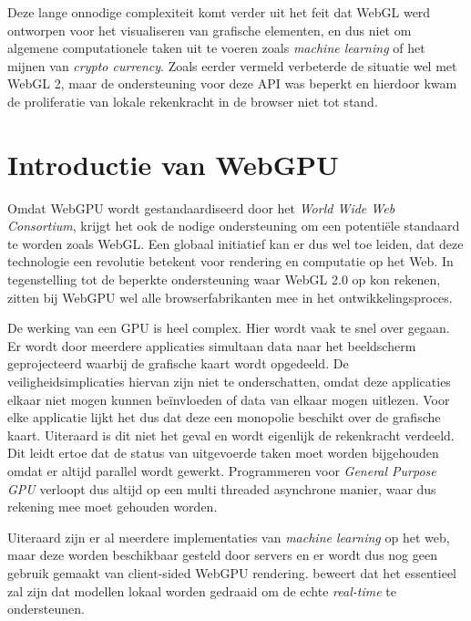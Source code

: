 \bigbreak{}

Deze lange onnodige complexiteit komt verder uit het feit dat WebGL werd ontworpen voor het visualiseren van grafische elementen, en dus niet om algemene computationele taken uit te voeren zoals \textit{machine learning} of het mijnen van \textit{crypto currency}. Zoals eerder vermeld verbeterde de situatie wel met WebGL 2, maar de ondersteuning voor deze API was beperkt en hierdoor kwam de proliferatie van lokale rekenkracht in de browser niet tot stand.

\break{}

\section{Introductie van WebGPU}

Omdat WebGPU wordt gestandaardiseerd door het \textit{World Wide Web Consortium}, krijgt het ook de nodige ondersteuning om een potentiële standaard te worden zoals WebGL. Een globaal initiatief kan er dus wel toe leiden, dat deze technologie een revolutie betekent voor rendering en computatie op het Web. In tegenstelling tot de beperkte ondersteuning waar WebGL 2.0 op kon rekenen, zitten bij WebGPU wel alle browserfabrikanten mee in het ontwikkelingsproces. \autocite{Surma2022}

\bigbreak{}

De werking van een GPU is heel complex. Hier wordt vaak te snel over gegaan. Er wordt door meerdere applicaties simultaan data naar het beeldscherm geprojecteerd waarbij de grafische kaart wordt opgedeeld. De veiligheidsimplicaties hiervan zijn niet te onderschatten, omdat deze applicaties elkaar niet mogen kunnen beïnvloeden of data van elkaar mogen uitlezen. Voor elke applicatie lijkt het dus dat deze een monopolie beschikt over de grafische kaart. Uiteraard is dit niet het geval en wordt eigenlijk de rekenkracht verdeeld. Dit leidt ertoe dat de status van uitgevoerde taken moet worden bijgehouden omdat er altijd parallel wordt gewerkt. Programmeren voor \textit{General Purpose GPU} verloopt dus altijd op een multi threaded asynchrone manier, waar dus rekening mee moet gehouden worden. \autocite{Surma2022}

\bigbreak{}

Uiteraard zijn er al meerdere implementaties van \textit{machine learning} op het web, maar deze worden beschikbaar gesteld door servers en er wordt dus nog geen gebruik gemaakt van client-sided WebGPU rendering. \textcite{Fleetwood2023a} beweert dat het essentieel zal zijn dat modellen lokaal worden gedraaid om de echte \textit{real-time} te ondersteunen.

